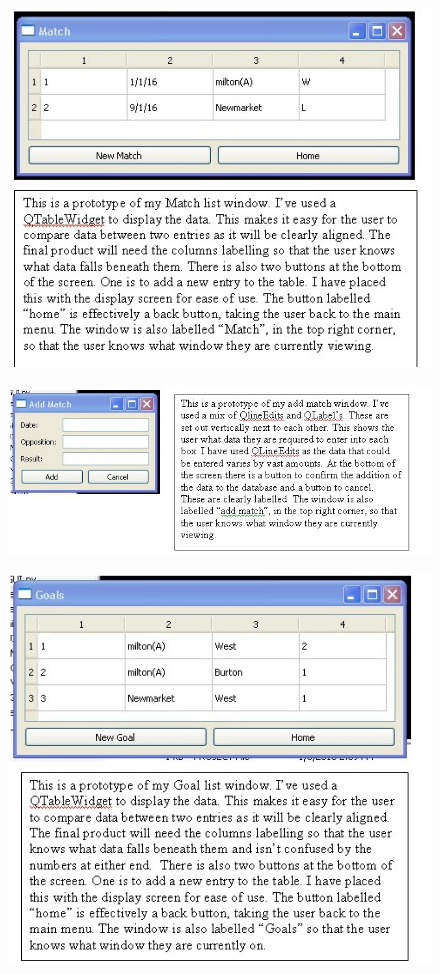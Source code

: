 \begin{figure}[H]
	\includegraphics[width=150mm]{MatchPT}
\end{figure}
\begin{figure}[H]
	\includegraphics[width=150mm]{AddMatchPT}
\end{figure}
\begin{figure}[H]
	\includegraphics[width=150mm]{GoalsPT}
\end{figure}
